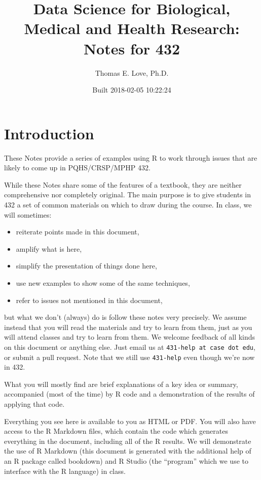 \documentclass[]{book}
\title{Data Science for Biological, Medical and Health Research: Notes for 432}
\author{Thomas E. Love, Ph.D.}
\date{Built 2018-02-05 10:22:24}
\providecommand{\tightlist}{%
  \setlength{\itemsep}{0pt}\setlength{\parskip}{0pt}}
\theoremstyle{definition}
\theoremstyle{definition}
\theoremstyle{definition}
\theoremstyle{remark}
\begin{document}
\maketitle

{
\setcounter{tocdepth}{1}
\tableofcontents
}
\chapter*{Introduction}\label{introduction}

These Notes provide a series of examples using R to work through issues
that are likely to come up in PQHS/CRSP/MPHP 432.

While these Notes share some of the features of a textbook, they are
neither comprehensive nor completely original. The main purpose is to
give students in 432 a set of common materials on which to draw during
the course. In class, we will sometimes:

\begin{itemize}
\tightlist
\item
  reiterate points made in this document,
\item
  amplify what is here,
\item
  simplify the presentation of things done here,
\item
  use new examples to show some of the same techniques,
\item
  refer to issues not mentioned in this document,
\end{itemize}

but what we don't (always) do is follow these notes very precisely. We
assume instead that you will read the materials and try to learn from
them, just as you will attend classes and try to learn from them. We
welcome feedback of all kinds on this document or anything else. Just
email us at \texttt{431-help\ at\ case\ dot\ edu}, or submit a pull
request. Note that we still use \texttt{431-help} even though we're now
in 432.

What you will mostly find are brief explanations of a key idea or
summary, accompanied (most of the time) by R code and a demonstration of
the results of applying that code.

Everything you see here is available to you as HTML or PDF. You will
also have access to the R Markdown files, which contain the code which
generates everything in the document, including all of the R results. We
will demonstrate the use of R Markdown (this document is generated with
the additional help of an R package called bookdown) and R Studio (the
``program'' which we use to interface with the R language) in class.
\end{document}
